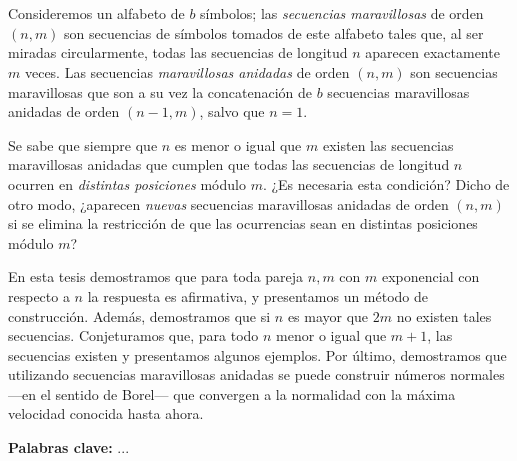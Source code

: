 \chapter*{\runtitulo}

Consideremos un alfabeto de $b$ símbolos; las \emph{secuencias maravillosas}
de orden $(n,m)$ son secuencias de símbolos tomados de este alfabeto
tales que, al ser miradas circularmente, todas las
secuencias de longitud $n$ aparecen exactamente $m$ veces.
Las secuencias \emph{maravillosas anidadas} de orden $(n,m)$ son secuencias
maravillosas que son a su vez la concatenación de $b$ secuencias
maravillosas anidadas de orden $(n-1, m)$, salvo que $n = 1$.

Se sabe que siempre que $n$ es menor o igual que $m$ existen las secuencias
maravillosas anidadas que cumplen que todas las secuencias de longitud $n$
ocurren en \emph{distintas posiciones} módulo $m$.
¿Es necesaria esta condición? Dicho de otro modo, ¿aparecen \emph{nuevas} secuencias
maravillosas anidadas de orden $(n,m)$ si se elimina la restricción de que las
ocurrencias sean en distintas posiciones módulo $m$?

En esta tesis demostramos que para toda pareja $n, m$ con $m$ exponencial con
respecto a $n$ la respuesta es afirmativa, y presentamos un método de construcción.
Además, demostramos que si $n$ es mayor que $2m$ no existen tales secuencias.
Conjeturamos que, para todo $n$ menor o igual que $m + 1$, las secuencias
existen y presentamos algunos ejemplos.
Por último, demostramos que utilizando secuencias maravillosas anidadas se puede
construir números normales ---en el sentido de Borel--- que convergen a la
normalidad con la máxima velocidad conocida hasta ahora.

\bigskip

\noindent\textbf{Palabras clave:} ...
